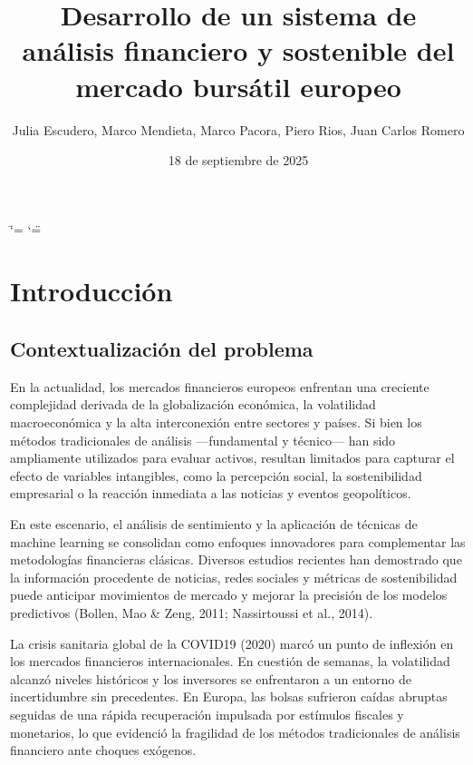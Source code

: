 \documentclass[letterpaper,10pt,spanish]{sphinxmanual}
\title{Desarrollo de un sistema de análisis financiero y sostenible del mercado bursátil europeo}
\date{18 de septiembre de 2025}
\author{Julia Escudero, Marco Mendieta, Marco Pacora, Piero Rios, Juan Carlos Romero}
\begin{document}
\ifdefined\shorthandoff
  \ifnum\catcode`\=\string=\active\shorthandoff{=}\fi
  \ifnum\catcode`\"=\active{}\fi
\fi

\pagestyle{empty}
\sphinxmaketitle
\pagestyle{plain}
\sphinxtableofcontents
\pagestyle{normal}
\label{\detokenize{index::doc}}


\sphinxstepscope


\chapter{Introducción}
\label{\detokenize{Introduccion:introduccion}}\label{\detokenize{Introduccion::doc}}

\section{Contextualización del problema}
\label{\detokenize{Introduccion:contextualizacion-del-problema}}
\sphinxAtStartPar
En la actualidad, los mercados financieros europeos enfrentan una creciente complejidad derivada de la globalización económica, la volatilidad macroeconómica y la alta interconexión entre sectores y países. Si bien los métodos tradicionales de análisis —fundamental y técnico— han sido ampliamente utilizados para evaluar activos, resultan limitados para capturar el efecto de variables intangibles, como la percepción social, la sostenibilidad empresarial o la reacción inmediata a las noticias y eventos geopolíticos.

\sphinxAtStartPar
En este escenario, el análisis de sentimiento y la aplicación de técnicas de machine learning se consolidan como enfoques innovadores para complementar las metodologías financieras clásicas. Diversos estudios recientes han demostrado que la información procedente de noticias, redes sociales y métricas de sostenibilidad puede anticipar movimientos de mercado y mejorar la precisión de los modelos predictivos (Bollen, Mao \& Zeng, 2011; Nassirtoussi et al., 2014).

\sphinxAtStartPar
La crisis sanitaria global de la COVID\sphinxhyphen{}19 (2020) marcó un punto de inflexión en los mercados financieros internacionales. En cuestión de semanas, la volatilidad alcanzó niveles históricos y los inversores se enfrentaron a un entorno de incertidumbre sin precedentes. En Europa, las bolsas sufrieron caídas abruptas seguidas de una rápida recuperación impulsada por estímulos fiscales y monetarios, lo que evidenció la fragilidad de los métodos tradicionales de análisis financiero ante choques exógenos.
\end{document}
